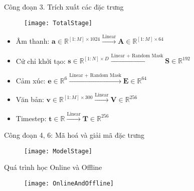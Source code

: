 \begin{frame}{Công đoạn 3. Trích xuất các đặc trưng}
	
	\begin{figure}
		\texttt{[image: TotalStage]}
	\end{figure}
	\vspace{10pt}
	\begin{itemize}
		\item Âm thanh: $\mathbf{a} \in \mathbb{R}^{ [1:M] \times 1024} \xrightarrow{\text{Linear} } \mathbf{A} \in \mathbb{R}^{[1:M] \times 64}$
		\item Cử chỉ khởi tạo: $\mathbf{s} \in \mathbb{R}^{[1:N] \times D}  \xrightarrow{\text{Linear + Random Mask} } \mathbf{S} \in \mathbb{R}^{192} $ 
		\item Cảm xúc: $\mathbf{e} \in \mathbb{R}^{6}  \xrightarrow{\text{Linear + Random Mask} } \mathbf{E} \in \mathbb{R}^{64} $ 
		\item Văn bản: $\mathbf{v} \in \mathbb{R}^{[1:M] \times 300}  \xrightarrow{\text{Linear} } \mathbf{V} \in \mathbb{R}^{256}$
		\item Timestep: $\mathbf{t} \in \mathbb{R}  \xrightarrow{\text{Linear} } \mathbf{T} \in \mathbb{R}^{256} $ 
		
		
	\end{itemize}
\end{frame}
	
%	

\begin{frame}{Công đoạn 4, 6: Mã hoá và giải mã đặc trưng}
	\begin{figure}
		\centering
		\texttt{[image: ModelStage]}
	\end{figure}
\end{frame}


\begin{frame}{Quá trình học Online và Offline}
	\begin{figure}
		\centering
		\texttt{[image: OnlineAndOffline]}
	\end{figure}
\end{frame}


